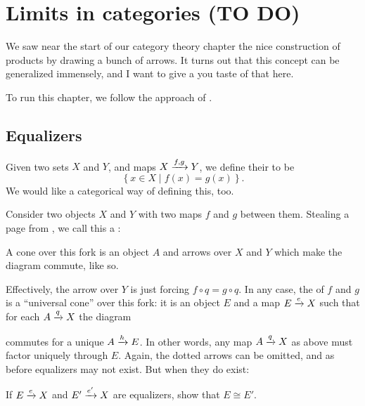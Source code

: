 \chapter{Limits in categories (TO DO)}
\label{ch:category_limits}
We saw near the start of our category theory chapter
the nice construction of products by drawing
a bunch of arrows.
It turns out that this concept can be generalized immensely,
and I want to give a you taste of that here.

To run this chapter, we follow the approach of \cite{ref:msci}.

\section{Equalizers}
Given two sets $X$ and $Y$, and maps $X \xrightarrow{f,g} Y$, we define their  to be
\[ \left\{ x \in X \mid f(x) = g(x) \right\}. \]
We would like a categorical way of defining this, too.

Consider two objects $X$ and $Y$ with two maps $f$ and $g$ between them.
Stealing a page from \cite{ref:msci}, we call this a :
\begin{center}
\end{center}
A cone over this fork is an object $A$ and arrows over $X$ and $Y$
which make the diagram commute, like so.
\begin{center}
\end{center}
Effectively, the arrow over $Y$ is just forcing $f \circ q = g \circ q$.
In any case, the  of $f$ and $g$ is a ``universal cone'' over this fork:
it is an object $E$ and a map $E \xrightarrow{e} X$ such that
for each $A \xrightarrow{q} X$ the diagram
\begin{center}
\end{center}
commutes for a unique $A \xrightarrow{h} E$.
In other words, any map $A \xrightarrow{q} X$ as above
must factor uniquely through $E$.
Again, the dotted arrows can be omitted,
and as before equalizers may not exist.
But when they do exist:
\begin{exercise}
	If $E \xrightarrow{e} X$ and $E' \xrightarrow{e'} X$ are equalizers,
	show that $E \cong E'$.
\end{exercise}

